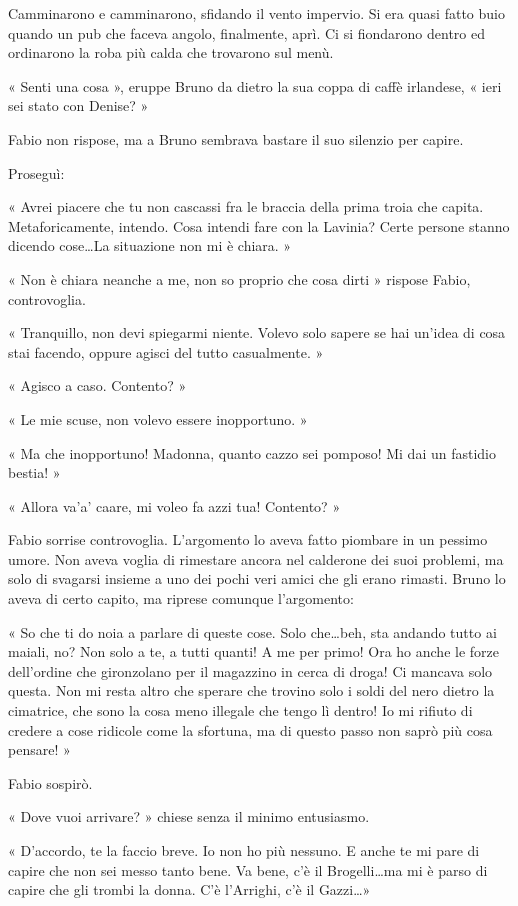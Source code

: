 Camminarono e camminarono, sfidando il vento impervio. Si era quasi fatto buio quando un pub che faceva angolo, finalmente, aprì. Ci si fiondarono dentro ed ordinarono la roba più calda che trovarono sul menù.

« Senti una cosa », eruppe Bruno da dietro la sua coppa di caffè irlandese, « ieri sei stato con Denise? »

Fabio non rispose, ma a Bruno sembrava bastare il suo silenzio per capire.

Proseguì:

« Avrei piacere che tu non cascassi fra le braccia della prima troia che capita. Metaforicamente, intendo. Cosa intendi fare con la Lavinia? Certe persone stanno dicendo cose\ldots La situazione non mi è chiara. »

« Non è chiara neanche a me, non so proprio che cosa dirti » rispose Fabio, controvoglia.

« Tranquillo, non devi spiegarmi niente. Volevo solo sapere se hai un'idea di cosa stai facendo, oppure agisci del tutto casualmente. »

« Agisco a caso. Contento? »

« Le mie scuse, non volevo essere inopportuno. »

« Ma che inopportuno! Madonna, quanto cazzo sei pomposo! Mi dai un fastidio bestia! »

« Allora va'a' caare, mi voleo fa \textsc{}azzi tua! Contento? »

Fabio sorrise controvoglia. L'argomento lo aveva fatto piombare in un pessimo umore. Non aveva voglia di rimestare ancora nel calderone dei suoi problemi, ma solo di svagarsi insieme a uno dei pochi veri amici che gli erano rimasti. Bruno lo aveva di certo capito, ma riprese comunque l'argomento:

« So che ti do noia a parlare di queste cose. Solo che\ldots beh, sta andando tutto ai maiali, no? Non solo a te, a tutti quanti! A me per primo! Ora ho anche le forze dell'ordine che gironzolano per il magazzino in cerca di droga! Ci mancava solo questa. Non mi resta altro che sperare che trovino solo i soldi del nero dietro la cimatrice, che sono la cosa meno illegale che tengo lì dentro! Io mi rifiuto di credere a cose ridicole come la sfortuna, ma di questo passo non saprò più cosa pensare! »

Fabio sospirò.

« Dove vuoi arrivare? » chiese senza il minimo entusiasmo.

« D'accordo, te la faccio breve. Io non ho più nessuno. E anche te mi pare di capire che non sei messo tanto bene. Va bene, c'è il Brogelli\ldots ma mi è parso di capire che gli trombi la donna. C'è l'Arrighi, c'è il Gazzi\ldots »

